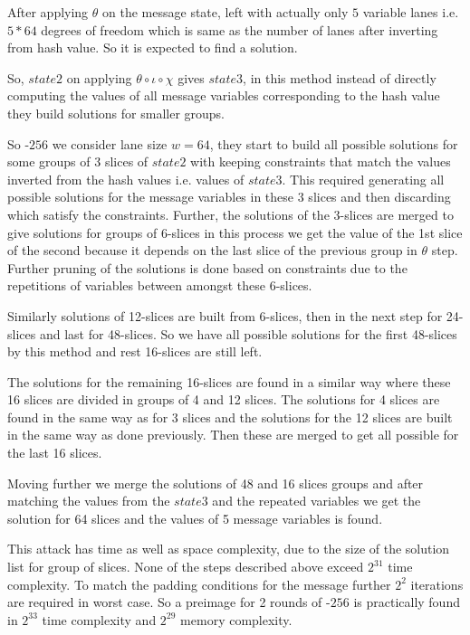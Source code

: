 After applying $\theta$ on the message state, left with actually only $5$ variable lanes i.e. $5*64$ degrees of freedom which is same as the number of lanes after inverting from hash value. So it is expected to find a solution.

So, $state2$ on applying $\theta \circ \iota \circ \chi$ gives $state3$, in this method instead of directly computing the values of all message variables corresponding to the hash value they build solutions for smaller groups. 

So \KECCAK-$256$ we consider lane size $w = 64$, they start to build all possible solutions for some groups of 3 slices of $state2$ with keeping constraints that match the values inverted from the hash values i.e. values of $state3$. This required generating all possible solutions for the message variables in these 3 slices and then discarding which satisfy the constraints.
Further, the solutions of the 3-slices are merged to give solutions for groups of 6-slices in this process we get the value of the 1st slice of the second because it depends on the last slice of the previous group in $\theta$ step. Further pruning of the solutions is done based on constraints due to the repetitions of variables between amongst these 6-slices.

Similarly solutions of 12-slices are built from 6-slices, then in the next step for 24-slices and last for 48-slices. 
So we have all possible solutions for the first 48-slices by this method and rest 16-slices are still left.

The solutions for the remaining 16-slices are found in a similar way where these 16 slices are divided in groups of 4 and 12 slices. The solutions for 4 slices are found in the same way as for 3 slices and the solutions for the 12 slices are built in the same way as done previously. Then these are merged to get all possible for the last 16 slices.

Moving further we merge the solutions of 48 and 16 slices groups and after matching the values from the $state3$ and the repeated variables we get the solution for 64 slices and the values of 5 message variables is found. 

This attack has time as well as space complexity, due to the size of the solution list for group of slices. None of the steps described above exceed $2^{31}$ time complexity. To match the padding conditions for the message further $2^2$ iterations are required in worst case. So a preimage for 2 rounds of \KECCAK-$256$ is practically found in $2^{33}$ time complexity and $2^{29}$ memory complexity.


